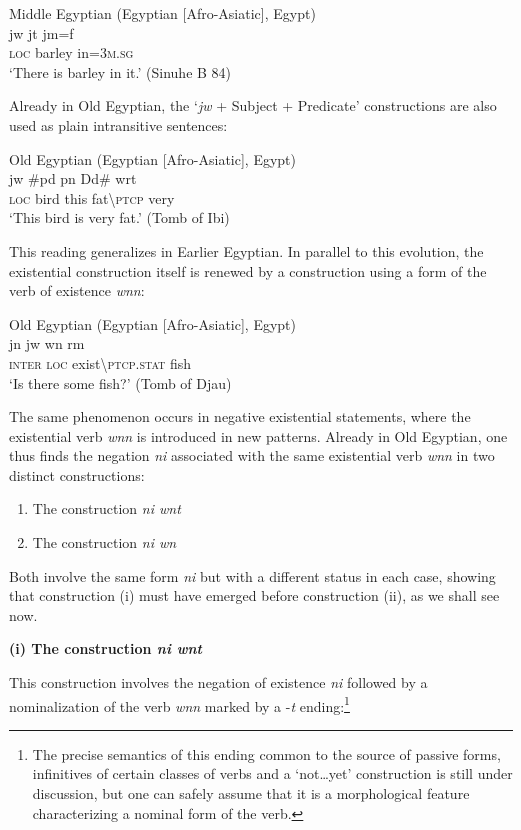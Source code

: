 \documentclass[output=paper]{langsci/langscibook}
\begin{document}
\ea Middle Egyptian (Egyptian [Afro-Asiatic], Egypt) \label{ex:AE18}\\
	\gll jw jt jm=f\\
	\textsc{loc} barley in=\textsc{3m.sg}\\
	\glt ‘There is barley in it.’ (Sinuhe B 84)
\z 

Already in Old Egyptian, the ‘\textit{jw} + Subject + Predicate’ constructions are also used as plain intransitive sentences: 

\ea Old Egyptian (Egyptian [Afro-Asiatic], Egypt) \label{ex:AE19}\\
	\gll jw \#pd pn Dd\# wrt\\ 
	\textsc{loc} bird this fat\textbackslash\textsc{ptcp} very\\
	\glt ‘This bird is very fat.’ (Tomb of Ibi)
\z 

This reading generalizes in Earlier Egyptian. In parallel to this evolution, the existential construction itself is renewed by a construction using a form of the verb of existence \textit{wnn}:

\ea Old Egyptian (Egyptian [Afro-Asiatic], Egypt) \label{ex:AE20}\\
	\gll jn jw wn rm\\ 
	\textsc{inter} \textsc{loc} exist\textbackslash\textsc{ptcp.stat} fish\\
	\glt ‘Is there some fish?’ (Tomb of Djau)
\z 

The same phenomenon occurs in negative existential statements, where the existential verb \textit{wnn} is introduced in new patterns. Already in Old Egyptian, one thus finds the negation \textit{ni} associated with the same existential verb \textit{wnn} in two distinct constructions: 
\begin{enumerate}
    \item The construction \textit{ni wnt} 
    \item The construction \textit{ni wn}
\end{enumerate}
 
Both involve the same form \textit{ni} but with a different status in each case, showing that construction (i) must have emerged before construction (ii), as we shall see now.  

\medskip
\noindent
\textbf{(i) The construction \textit{ni wnt}} 

This construction involves the negation of existence \textit{ni} followed by a nominalization of the verb \textit{wnn} marked by a -\textit{t} ending:\footnote{The precise semantics of this ending common to the source of passive forms, infinitives of certain classes of verbs and a ‘not…yet’ construction is still under discussion, but one can safely assume that it is a morphological feature characterizing a nominal form of the verb.}
\end{document}
